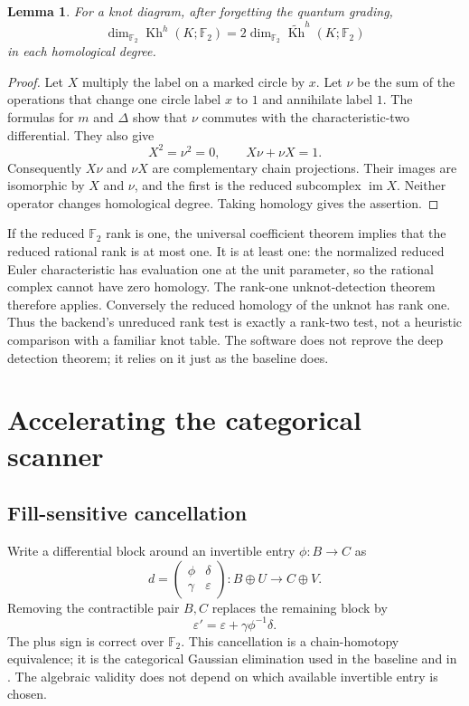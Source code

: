 \documentclass[11pt]{article}
\newtheorem{lemma}[theorem]{Lemma}
\theoremstyle{definition}\newtheorem{definition}[theorem]{Definition}
\theoremstyle{remark}\newtheorem{remark}[theorem]{Remark}
\newcommand{\F}{\mathbb F_2}
\newcommand{\Kh}{\operatorname{Kh}}
\newcommand{\rKh}{\widetilde{\operatorname{Kh}}}
\begin{document}
\begin{lemma}\label{lem:double}
For a knot diagram, after forgetting the quantum grading,
\[
 \dim_{\F}\Kh^h(K;\F)=2\dim_{\F}\rKh^h(K;\F)
\]
in each homological degree.
\end{lemma}
\begin{proof}
Let $X$ multiply the label on a marked circle by $x$. Let $\nu$ be the sum of
the operations that change one circle label $x$ to $1$ and annihilate label
$1$. The formulas for $m$ and $\Delta$ show that $\nu$ commutes with the
characteristic-two differential. They also give
\[
 X^2=\nu^2=0,\qquad X\nu+\nu X=1.
\]
Consequently $X\nu$ and $\nu X$ are complementary chain projections.
Their images are isomorphic by $X$ and $\nu$, and the first is the reduced
subcomplex $\operatorname{im}X$. Neither operator changes homological degree.
Taking homology gives the assertion.
\end{proof}

If the reduced $\F$ rank is one, the universal coefficient theorem implies
that the reduced rational rank is at most one. It is at least one: the
normalized reduced Euler characteristic has evaluation one at the unit
parameter, so the rational complex cannot have zero homology. The
rank-one unknot-detection theorem therefore applies. Conversely the reduced
homology of the unknot has rank one. Thus the backend's unreduced rank test
is exactly a rank-two test, not a heuristic comparison with a familiar knot
table. The software does not reprove the deep detection theorem; it relies on
it just as the baseline does.

\section{Accelerating the categorical scanner}
\label{sec:scanner}

\subsection{Fill-sensitive cancellation}

Write a differential block around an invertible entry $\phi:B\to C$ as
\[
 d=\begin{pmatrix}\phi&\delta\\ \gamma&\varepsilon\end{pmatrix}
 :B\oplus U\longrightarrow C\oplus V.
\]
Removing the contractible pair $B,C$ replaces the remaining block by
\begin{equation}\label{eq:schur}
 \varepsilon'=\varepsilon+\gamma\phi^{-1}\delta.
\end{equation}
The plus sign is correct over $\F$. This cancellation is a chain-homotopy
equivalence; it is the categorical Gaussian elimination used in the baseline
and in \cite{BN}. The algebraic validity does not depend on which available
invertible entry is chosen.
\end{document}
